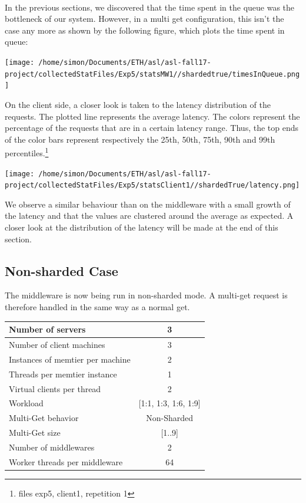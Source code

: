 \documentclass[11pt,a4paper]{article}
\begin{document}
\\
In the previous sections, we discovered that the time spent in the queue was the bottleneck of our system. However, in a multi get configuration, this isn't the case any more as shown by the following figure, which plots the time spent in queue:  
 \begin{center}
\texttt{[image: /home/simon/Documents/ETH/asl/asl-fall17-project/collectedStatFiles/Exp5/statsMW1//shardedtrue/timesInQueue.png]}
\end{center}


On the client side, a closer look is taken to the latency distribution of the requests. The plotted line represents the average latency. The colors represent the percentage of the requests that are in a certain latency range. Thus, the top ends of the color bars represent respectively the 25th, 50th, 75th, 90th and 99th percentiles.\footnote{files exp5, client1, repetition 1} 
  
 \begin{center}
\texttt{[image: /home/simon/Documents/ETH/asl/asl-fall17-project/collectedStatFiles/Exp5/statsClient1//shardedTrue/latency.png]}
\end{center}

We observe a similar behaviour than on the middleware with a small growth of the latency and that the values are clustered around the average as expected. A closer look at the distribution of the latency will be made at the end of this section. 

\subsection{Non-sharded Case}

The middleware is now being run in non-sharded mode. A multi-get request is therefore handled in the same way as a normal get. 

\begin{center}
	\scriptsize{
		\begin{tabular}{|l|c|}
			\hline Number of servers                & 3                       \\ 
			\hline Number of client machines        & 3                       \\ 
			\hline Instances of memtier per machine & 2                       \\ 
			\hline Threads per memtier instance     & 1                       \\
			\hline Virtual clients per thread       & 2                		 \\ 
			\hline Workload                         & [1:1, 1:3, 1:6, 1:9]             \\
			\hline Multi-Get behavior               & Non-Sharded             \\
			\hline Multi-Get size                   & [1..9]                  \\
			\hline Number of middlewares            & 2                       \\
			\hline Worker threads per middleware    & 64 \\
			\hline 
		\end{tabular}
	} 
\end{center}
\end{document}
